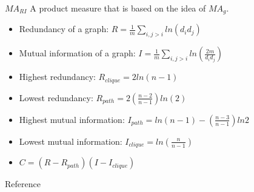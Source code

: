 \documentclass{beamer}
\begin{document}
    \begin{frame}{$MA_{RI}$}
        A product measure that is based on the idea of $MA_g$.
        \begin{itemize}
            \item Redundancy of a graph: $R=\frac{1}{m}\sum_{i,j>i}ln(d_id_j)$
            \item Mutual information of a graph: $I=\frac{1}{m}\sum_{i,j>i}ln(\frac{2m}{d_id_j})$
            \item Highest redundancy: $R_{clique} = 2ln(n-1)$
            \item Lowest redundancy: $R_{path} = 2(\frac{n-2}{n-1})ln(2)$
            \item Highest mutual information: $I_{path} = ln(n-1)-(\frac{n-3}{n-1})ln2$
            \item Lowest mutual information: $I_{clique}=ln(\frac{n}{n-1})$
            \item $C = (R - R_{path})(I-I_{clique})$
        \end{itemize}
    \end{frame}




    \begin{frame}{Reference}
    \end{frame}
\end{document}
